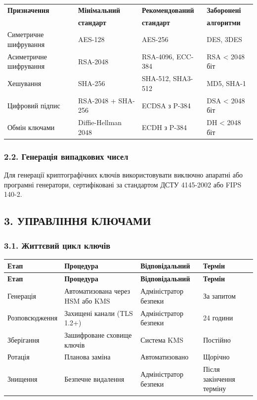 \begin{table}[h]
\centering
\begin{tabular}{|l|l|l|l|}
\hline
\textbf{Призначення} & \textbf{Мінімальний} & \textbf{Рекомендований} & \textbf{Заборонені} \\
& \textbf{стандарт} & \textbf{стандарт} & \textbf{алгоритми} \\
\hline
Симетричне шифрування & AES-128 & AES-256 & DES, 3DES \\
\hline
Асиметричне шифрування & RSA-2048 & RSA-4096, ECC-384 & RSA < 2048 біт \\
\hline
Хешування & SHA-256 & SHA-512, SHA3-512 & MD5, SHA-1 \\
\hline
Цифровий підпис & RSA-2048 + SHA-256 & ECDSA з P-384 & DSA < 2048 біт \\
\hline
Обмін ключами & Diffie-Hellman 2048 & ECDH з P-384 & DH < 2048 біт \\
\hline
\end{tabular}
\end{table}

\subsubsection*{2.2. Генерація випадкових чисел}
Для генерації криптографічних ключів використовувати виключно апаратні або програмні генератори, сертифіковані за стандартом ДСТУ 4145-2002 або FIPS 140-2.

\subsection*{3. УПРАВЛІННЯ КЛЮЧАМИ}

\subsubsection*{3.1. Життєвий цикл ключів}

\begin{longtable}{|l|p{4cm}|l|l|}
\hline
\textbf{Етап} & \textbf{Процедура} & \textbf{Відповідальний} & \textbf{Термін} \\
\hline
\endfirsthead
\hline
\textbf{Етап} & \textbf{Процедура} & \textbf{Відповідальний} & \textbf{Термін} \\
\hline
\endhead
Генерація & Автоматизована через HSM або KMS & Адміністратор безпеки & За запитом \\
\hline
Розповсюдження & Захищені канали (TLS 1.2+) & Адміністратор безпеки & 24 години \\
\hline
Зберігання & Зашифроване сховище ключів & Система KMS & Постійно \\
\hline
Ротація & Планова заміна & Автоматизовано & Щорічно \\
\hline
Знищення & Безпечне видалення & Адміністратор безпеки & Після закінчення терміну \\
\hline
\end{longtable}

